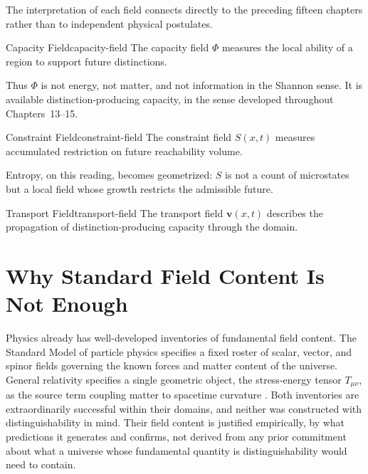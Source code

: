 \documentclass[12pt,twoside,openright]{book}
\begin{document}
The interpretation of each field connects directly to the
preceding fifteen chapters rather than to independent
physical postulates.

\begin{definition}{Capacity Field}{capacity-field}
  The capacity field $\Phi$ measures the local ability of
  a region to support future distinctions.
\end{definition}

Thus $\Phi$ is not energy, not matter, and not information
in the Shannon sense. It is available
distinction-producing capacity, in the sense developed
throughout Chapters~13--15.

\begin{definition}{Constraint Field}{constraint-field}
  The constraint field $S(x,t)$ measures accumulated
  restriction on future reachability volume.
\end{definition}

Entropy, on this reading, becomes geometrized: $S$ is not
a count of microstates but a local field whose growth
restricts the admissible future.

\begin{definition}{Transport Field}{transport-field}
  The transport field $\mathbf{v}(x,t)$ describes the
  propagation of distinction-producing capacity through
  the domain.
\end{definition}

\section{Why Standard Field Content Is Not Enough}
\label{sec:ch16-why-standard-fields}

Physics already has well-developed inventories of fundamental
field content. The Standard Model of particle physics
specifies a fixed roster of scalar, vector, and spinor fields
governing the known forces and matter content of the
universe. General relativity specifies a single geometric
object, the stress-energy tensor $T_{\mu\nu}$, as the source
term coupling matter to spacetime curvature
\parencite{misner1973}. Both inventories are extraordinarily
successful within their domains, and neither was constructed
with distinguishability in mind. Their field content is
justified empirically, by what predictions it generates and
confirms, not derived from any prior commitment about what a
universe whose fundamental quantity is distinguishability
would need to contain.
\end{document}
